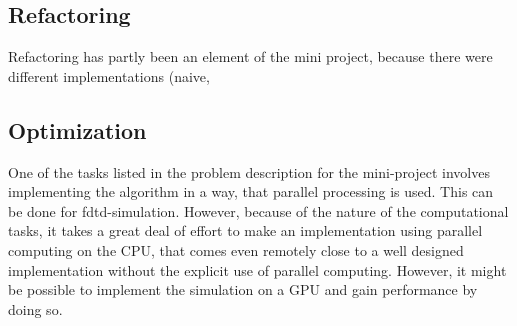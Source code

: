\subsection{Refactoring}\label{ssec:refactoring}
Refactoring has partly been an element of the mini project, because there were different implementations (naive,
\subsection{Optimization}\label{ssec:optimization}
One of the tasks listed in the problem description for the mini-project involves implementing the algorithm in a way, that parallel processing is used. This can be done for \gls{fdtd}-simulation. However, because of the nature of the computational tasks, it takes a great deal of effort to make an implementation using parallel computing on the CPU, that comes even remotely close to a well designed implementation without the explicit use of parallel computing.
However, it might be possible to implement the simulation on a GPU and gain performance by doing so. 